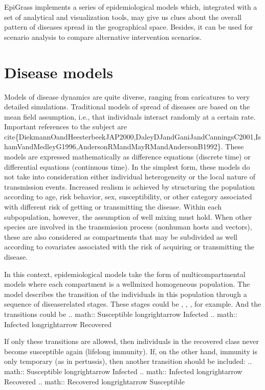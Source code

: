 \documentclass[letterpaper,10pt,english]{sphinxmanual}
\begin{document}
EpiGrass implements a series of epidemiological models which, integrated with a set of analytical and visualization tools,  may give us clues about the overall pattern of diseases spread in the geographical space. Besides, it can be used for scenario analysis to compare alternative intervention scenarios.


\section{Disease models}
\label{\detokenize{intromodels:disease-models}}
Models of disease dynamics are quite diverse, ranging from caricatures
to very detailed simulations. Traditional models of spread of diseases
are based on the mean field assumption, i.e., that individuals
interact randomly at a certain rate. Important references to the
subject are
cite\{DiekmannOandHeesterbeekJAP2000,DaleyDJandGaniJandCanningsC2001,IshamVandMedleyG1996,AndersonRMandMayRMandAndersonB1992\}.
These models are expressed mathematically as difference equations
(discrete time) or differential equations (continuous time). In the
simplest form, these models do not take into consideration either
individual heterogeneity or the local nature of transmission
events. Increased realism is achieved by structuring the population according to age, risk behavior, sex, susceptibility, or other category associated with different risk of getting or transmitting the disease. Within each sub\sphinxhyphen{}population, however, the assumption of well mixing must hold. When other species are involved in the transmission process (non\sphinxhyphen{}human hosts and vectors), these are also considered as compartments that may be sub\sphinxhyphen{}divided as well according to covariates associated with the risk of acquiring or transmitting the disease.

In this context, epidemiological models take the form of multi\sphinxhyphen{}compartmental models where each compartment is a well\sphinxhyphen{}mixed homogeneous population. The model describes the transition of the individuals in this population through a sequence of disease\sphinxhyphen{}related stages. These stages could be , , , for example. And the transitions could be
.. math:: Susceptible longrightarrow Infected
.. math:: Infected longrightarrow Recovered

If only these transitions are allowed, then individuals in the recovered class never become susceptible again (lifelong immunity). If, on the other hand, immunity is only temporary (as in pertussis), then another transition should be included:
.. math:: Susceptible longrightarrow Infected
.. math:: Infected longrightarrow Recovered
.. math:: Recovered longrightarrow Susceptible
\end{document}

